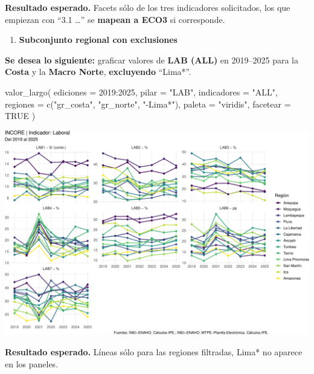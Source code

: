 \documentclass[
  11pt,
  letterpaper,
  DIV=11,
  numbers=noendperiod]{scrartcl}
\newenvironment{Shaded}{\begin{snugshade}}{\end{snugshade}}
\newcommand{\AttributeTok}[1]{\textcolor[rgb]{0.40,0.45,0.13}{#1}}
\newcommand{\ConstantTok}[1]{\textcolor[rgb]{0.56,0.35,0.01}{#1}}
\newcommand{\DecValTok}[1]{\textcolor[rgb]{0.68,0.00,0.00}{#1}}
\newcommand{\FunctionTok}[1]{\textcolor[rgb]{0.28,0.35,0.67}{#1}}
\newcommand{\NormalTok}[1]{\textcolor[rgb]{0.00,0.23,0.31}{#1}}
\newcommand{\SpecialCharTok}[1]{\textcolor[rgb]{0.37,0.37,0.37}{#1}}
\newcommand{\StringTok}[1]{\textcolor[rgb]{0.13,0.47,0.30}{#1}}
\providecommand{\tightlist}{%
  \setlength{\itemsep}{0pt}\setlength{\parskip}{0pt}}\usepackage{longtable,booktabs,array}
\begin{document}
\textbf{Resultado esperado.} Facets sólo de los tres indicadores
solicitados, los que empiezan con ``3.1 \ldots{}'' se \textbf{mapean a
ECO3} si corresponde.

\begin{enumerate}
\def\labelenumi{\arabic{enumi}.}
\setcounter{enumi}{2}
\tightlist
\item
  \textbf{Subconjunto regional con exclusiones}
\end{enumerate}

\textbf{Se desea lo siguiente:} graficar valores de \textbf{LAB (ALL)}
en 2019--2025 para la \textbf{Costa} y la \textbf{Macro Norte},
\textbf{excluyendo} ``Lima*''.

\begin{Shaded}
\begin{Highlighting}[]
\FunctionTok{valor\_largo}\NormalTok{(}
  \AttributeTok{ediciones   =} \DecValTok{2019}\SpecialCharTok{:}\DecValTok{2025}\NormalTok{,}
  \AttributeTok{pilar       =} \StringTok{"LAB"}\NormalTok{,}
  \AttributeTok{indicadores =} \StringTok{"ALL"}\NormalTok{,}
  \AttributeTok{regiones    =} \FunctionTok{c}\NormalTok{(}\StringTok{"gr\_costa"}\NormalTok{, }\StringTok{"gr\_norte"}\NormalTok{, }\StringTok{"{-}Lima*"}\NormalTok{),}
  \AttributeTok{paleta      =} \StringTok{"viridis"}\NormalTok{,}
  \AttributeTok{facetear    =} \ConstantTok{TRUE}
\NormalTok{)}
\end{Highlighting}
\end{Shaded}

\includegraphics{Manual_files/figure-pdf/unnamed-chunk-80-1.pdf}

\textbf{Resultado esperado.} Líneas sólo para las regiones filtradas,
Lima* no aparece en los paneles.
\end{document}
